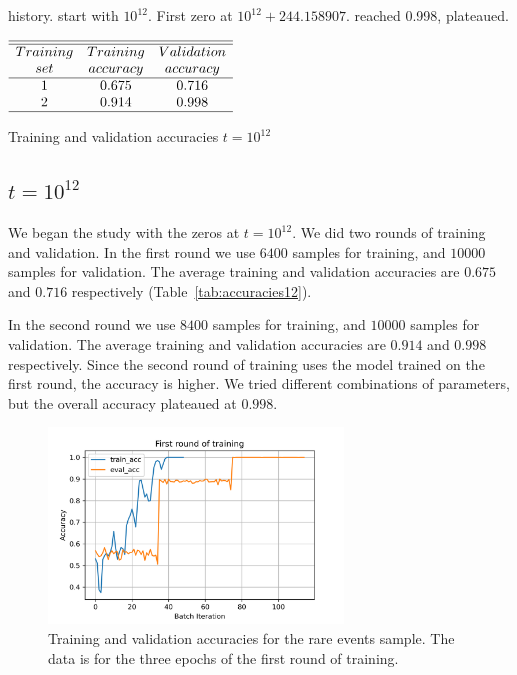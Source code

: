 \documentclass[journal]{IEEEtai}
\begin{document}
history. start with $10^{12}$. First zero   at $10^{12} + 244.158907$. reached 0.998, plateaued. 


\begin{table}
\centering \(\begin{array}{ccc}
\hline
\hline
Training  & Training &Validation  \\
set     &accuracy&accuracy\\
\hline
1  & 0.675 & 0.716 \\

2  & 0.914 & 0.998 \\
\hline
\end{array}\)
\caption{Training and validation accuracies $t=10^{12}$}
\label{tab:accuracies12}
\end{table}

\subsection{\label{10E12} $t=10^{12}$}

We began the study with the zeros at $t=10^{12}$.
We did two rounds of training and validation. In the first round we use $6400$ samples for training, and $10000$ samples for validation.   The average training and validation accuracies are $0.675$ and $0.716$ respectively (Table~\ref{tab:accuracies12}).

In the second round we use $8400$ samples for training, and $10000$ samples for validation. The average training and validation accuracies are $0.914$ and $0.998$ respectively. Since the second round of training uses the model trained on the first round, the accuracy is higher. We tried different combinations of parameters, but the overall accuracy plateaued at $0.998$.


\begin{figure}
\centerline{\includegraphics[width=18.5pc]{Figure1.png}}
\caption{Training and validation accuracies for the rare events sample. The data is for 
the three epochs of the first round of training.}
\label{fig:1}
\end{figure}
\end{document}
